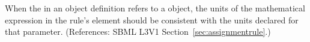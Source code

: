 When the  in an \AssignmentRule object definition refers to
a \Parameter object, the units of the mathematical expression in the rule's
 element should be consistent with the units declared for that
parameter.  (References: SBML L3V1 Section~\ref{sec:assignmentrule}.)

